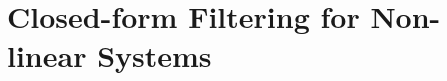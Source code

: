 \chapter[Closed-form Filtering for Non-linear Systems]{Closed-form Filtering for Non-linear Systems}\label{ch:hmm}



\begin{subappendices}

\end{subappendices}
